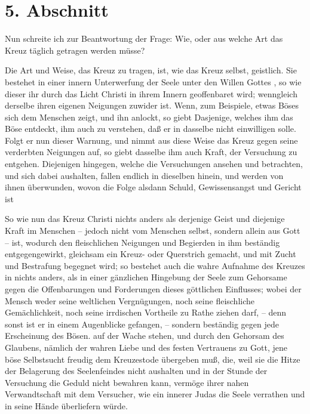 \section{5. Abschnitt} \label{kap3_ab5} 

Nun schreite ich zur Beantwortung der Frage: Wie, oder aus welche Art das Kreuz
täglich getragen werden müsse?

\medskip

Die Art und Weise, das Kreuz zu tragen, ist, wie das Kreuz selbst, geistlich.
Sie bestehet in einer innern Unterwerfung der Seele unter den Willen Gottes , so
wie dieser ihr durch das Licht Christi in ihrem Innern geoffenbaret wird;
wenngleich derselbe ihren eigenen Neigungen zuwider ist. Wenn, zum Beispiele,
etwas Böses sich dem Menschen zeigt, und ihn anlockt, so giebt Dasjenige,
welches ihm das Böse entdeckt, ihm auch zu verstehen, daß er in dasselbe nicht
einwilligen solle. Folgt er nun dieser Warnung, und nimmt aus diese Weise das
Kreuz gegen seine verderbten Neigungen auf, so giebt dasselbe ihm auch Kraft,
der Versuchung zu entgehen. Diejenigen hingegen, welche die Versuchungen ansehen
und betrachten, und sich dabei aushalten, fallen endlich in dieselben hinein,
und werden von ihnen überwunden, wovon die Folge alsdann Schuld, Gewissensangst
und Gericht ist

\medskip

So wie nun das Kreuz Christi nichts anders als derjenige Geist und diejenige
Kraft im Menschen -- jedoch nicht vom Menschen selbst, sondern allein aus Gott --
ist, wodurch den fleischlichen Neigungen und Begierden in ihm beständig
entgegengewirkt, gleichsam ein Kreuz- oder Querstrich gemacht, und mit Zucht und
Bestrafung begegnet wird; so bestehet auch die wahre Aufnahme des Kreuzes in
nichts anders, als in einer gänzlichen Hingebung der Seele zum Gehorsame gegen
die Offenbarungen und Forderungen dieses göttlichen Einflusses; wobei der Mensch
weder seine weltlichen Vergnügungen, noch seine fleischliche Gemächlichkeit,
noch seine irrdischen Vortheile zu Rathe ziehen darf, -- denn sonst ist er in
einem Augenblicke gefangen, -- sondern beständig gegen jede Erscheinung des
Bösen. auf der Wache stehen, und durch den Gehorsam des Glaubens, nämlich der
wahren Liebe und des festen Vertrauens zu Gott, jene böse Selbstsucht freudig
dem Kreuzestode übergeben muß, die, weil sie die Hitze der Belagerung des
Seelenfeindes nicht aushalten und in der Stunde der Versuchung die Geduld nicht
bewahren kann, vermöge ihrer nahen Verwandtschaft mit dem Versucher, wie ein
innerer Judas die Seele verrathen und in seine Hände überliefern würde.




